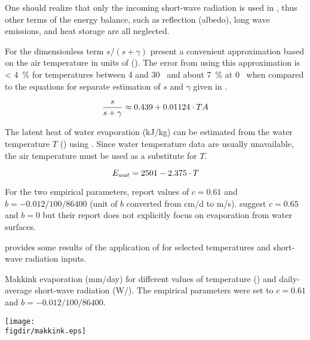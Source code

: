 \medskip
One should realize that only the incoming short-wave radiation is used in , thus other terms of the energy balance, such as reflection (albedo), long wave emissions, and heat storage are all neglected.

For the dimensionless term $s/(s + \gamma)$ \citet{Yao2009} present a convenient approximation based on the air temperature \airtemp{} in units of \celsius{}  (). The error from using this approximation is < 4~\% for temperatures between 4 and 30~\celsius{} and about 7~\% at 0~\celsius{} when compared to the equations for separate estimation of $s$ and $\gamma$ given in \citet{Hiemstra2011}.

\begin{equation} \label{eqn:evap_makkink_dimlessFraction}
  \frac{s}{s + \gamma} \approx 0.439 + 0.01124 \cdot TA
\end{equation}

The latent heat of water evaporation \evapHeatWater{} (kJ/kg) can be estimated from the water temperature $T$ (\celsius) using  \citep{Hiemstra2011}. Since water temperature data are usually unavailable, the air temperature \airtemp{} must be used as a substitute for $T$.

\begin{equation} \label{eqn:evap_makkink_evapHeatWater}
  E_{wat} = 2501 - 2.375 \cdot T
\end{equation}

For the two empirical parameters, \citet{Winter1995} report values of $c= 0.61$ and $b=-0.012/100/86400$ (unit of $b$ converted from cm/d to m/s). \citet{Hiemstra2011} suggest $c = 0.65$ and $b = 0$ but their report does not explicitly focus on evaporation from water surfaces.

 provides some results of the application of  for selected temperatures and short-wave radiation inputs.

\begin{table}
  \caption[Makkink evaporation for different values of temperature and daily-average short-wave radiation.]{Makkink evaporation (mm/day) for different values of temperature (\celsius{}) and daily-average short-wave radiation (W/\sqm). The empirical parameters were set to $c=0.61$ and $b=-0.012/100/86400$.  \label{tab:evap_makkink_example}}
  \centering
  \texttt{[image: \\figdir/makkink.eps]}
\end{table}
